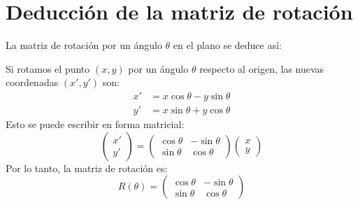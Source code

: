 \section{Deducción de la matriz de rotación}\label{sec:rotacion}
La matriz de rotación por un ángulo $\theta$ en el plano se deduce así:

Si rotamos el punto $(x, y)$ por un ángulo $\theta$ respecto al origen, las nuevas coordenadas $(x', y')$ son:
\begin{align*}
x' &= x \cos \theta - y \sin \theta \\
y' &= x \sin \theta + y \cos \theta
\end{align*}
Esto se puede escribir en forma matricial:
\begin{equation*}
\begin{pmatrix}
x' \\
y'
\end{pmatrix} =
\begin{pmatrix}
\cos \theta & -\sin \theta \\
\sin \theta & \cos \theta
\end{pmatrix}
\begin{pmatrix}
x \\
y
\end{pmatrix}
\end{equation*}
Por lo tanto, la matriz de rotación es:
\begin{equation*}
R(\theta) = \begin{pmatrix}
\cos \theta & -\sin \theta \\
\sin \theta & \cos \theta
\end{pmatrix}
\end{equation*}
